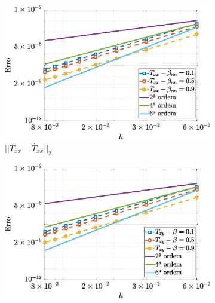 \begin{figure}[H]
    \centering
    \caption{Erro para as componentes dos tensores de tensões, utilizando os parâmetros $Re=100$ e $Wi=1$, para o escoamento de fluido viscoelástico com o modelo Oldroyd-B}
    \label{OBerror2}
    \begin{subfigure}[b]{.47\textwidth}
        \includegraphics[width=\textwidth]{figures/Case12/OldroydB/Errors/NormErr_2nd_Re_100_Wi_1_epsilon_0_xi_0_alphaG_0_Dt_1e-06_at_0.05_tipsim_1_MMS_12_Txx.eps}
        \caption{$||T_{xx} - \overline{T}_{xx}||_{2}$}
        \label{error_txx_2nd_Case1_oldorydb}
    \end{subfigure}
    \vspace{0.2cm}
    \qquad
    \begin{subfigure}[b]{.47\textwidth}
        \includegraphics[width=\textwidth]{figures/Case12/OldroydB/Errors/NormErr_2nd_Re_100_Wi_1_epsilon_0_xi_0_alphaG_0_Dt_1e-06_at_0.05_tipsim_1_MMS_12_Txy.eps}

\end{subfigure}
\end{figure}
